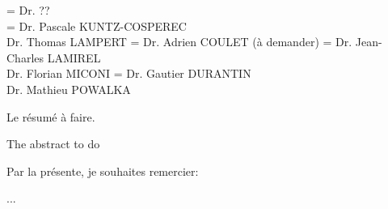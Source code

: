 \documentclass[11pt]{template/thesul}
\begin{document}



\ThesisUL

\President={
    Dr. ??\\
}
\Rapporteurs ={
    Dr. Pascale KUNTZ-COSPEREC\\
    Dr. Thomas LAMPERT
}
\Examinateurs={
    Dr. Adrien COULET (à demander)
}
\Encadrants={
    Dr. Jean-Charles LAMIREL\\
    Dr. Florian MICONI
}
\Invites={
    Dr. Gautier DURANTIN\\
    Dr. Mathieu POWALKA
}

\MakeThesisTitlePage



\NumberAbstractPages
\begin{ThesisAbstract}

    \begin{FrenchAbstract}
        Le résumé à faire.
    \end{FrenchAbstract}

    \begin{EnglishAbstract}
        The abstract to do
    \end{EnglishAbstract}
\end{ThesisAbstract}


\begin{ThesisAcknowledgments}

    Par la présente, je souhaites remercier:
    \begin{todolist}
        \item ...
    \end{todolist}

\end{ThesisAcknowledgments}
\end{document}
